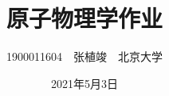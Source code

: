 \documentclass[a4paper,fontset=none]{ctexart}
\begin{document}
\title{\textbf{原子物理学作业}}
\author{1900011604\ \ 张植竣\ \ 北京大学}
\date{2021年5月3日}

\maketitle
\end{document}
